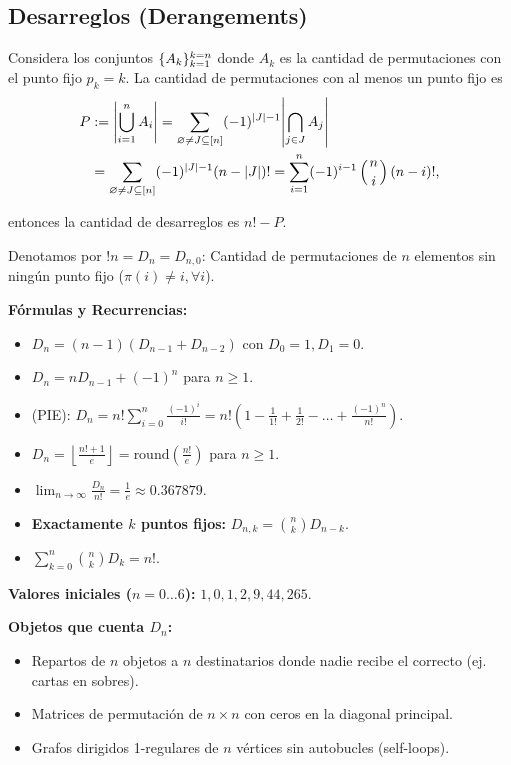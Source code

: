 \subsection{Desarreglos (Derangements)}

Considera los conjuntos $\{A_k\}_{k = 1}^{k = n}$ donde $A_k$ es la cantidad de permutaciones con el punto fijo $p_k = k$. La cantidad de permutaciones con al menos un punto fijo es
\begin{align*}
	P &:= \abs{\bigcup_{i = 1}^n A_i} = \sum_{\varnothing \neq J \subseteq [n]} (-1)^{|J| - 1}\abs{\bigcap_{j \in J} A_j}\\
	&= \sum_{\varnothing \neq J \subseteq [n]} (-1)^{|J| - 1}(n - |J|)!
	= \sum_{i = 1}^n (-1)^{i - 1}\binom{n}{i}(n - i)!,
\end{align*}

entonces la cantidad de desarreglos es $n! - P$. 

Denotamos por $!n =D_n = D_{n,0}$: Cantidad de permutaciones de $n$ elementos sin ningún punto fijo ($\pi(i) \neq i, \forall i$).

\textbf{Fórmulas y Recurrencias:}
\begin{itemize}[noitemsep]
    \item $D_n = (n-1)(D_{n-1} + D_{n-2})$ con $D_0 = 1, D_1 = 0$.
    \item $D_n = n D_{n-1} + (-1)^n$ para $n \geq 1$.
    \item (PIE): $D_n = n! \sum_{i=0}^{n} \frac{(-1)^i}{i!} = n! \left( 1 - \frac{1}{1!} + \frac{1}{2!} - \dots + \frac{(-1)^n}{n!} \right)$.
    \item $D_n = \left\lfloor \frac{n! + 1}{e} \right\rfloor = \text{round}\left(\frac{n!}{e}\right)$ para $n \geq 1$.
    \item $\lim_{n \to \infty} \frac{D_n}{n!} = \frac{1}{e} \approx 0.367879$.
    \item \textbf{Exactamente $k$ puntos fijos:} $D_{n,k} = \binom{n}{k} D_{n-k}$.
    \item $\sum_{k=0}^{n} \binom{n}{k} D_k = n!$.
\end{itemize}

\textbf{Valores iniciales ($n = 0 \dots 6$):} $1, 0, 1, 2, 9, 44, 265$.

\textbf{Objetos que cuenta $D_n$:}
\begin{itemize}[noitemsep]
    \item Repartos de $n$ objetos a $n$ destinatarios donde nadie recibe el correcto (ej. cartas en sobres).
    \item Matrices de permutación de $n \times n$ con ceros en la diagonal principal.
    \item Grafos dirigidos 1-regulares de $n$ vértices sin autobucles (self-loops).
\end{itemize}


